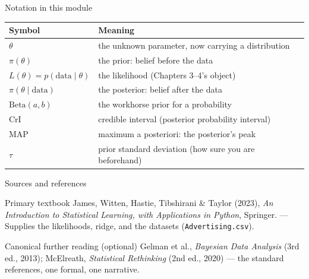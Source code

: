 \documentclass[aspectratio=169,11pt]{beamer}
\begin{document}
\begin{frame}{Notation in this module}
  \footnotesize
  \begin{center}
  \begin{tabular}{@{}ll@{}}
    \toprule
    \textbf{Symbol} & \textbf{Meaning} \\
    \midrule
    $\theta$ & the unknown parameter, now carrying a distribution \\
    $\pi(\theta)$ & the prior: belief before the data \\
    $L(\theta) = p(\text{data} \mid \theta)$ & the likelihood (Chapters 3--4's object) \\
    $\pi(\theta \mid \text{data})$ & the posterior: belief after the data \\
    $\text{Beta}(a, b)$ & the workhorse prior for a probability \\
    CrI & credible interval (posterior probability interval) \\
    MAP & maximum a posteriori: the posterior's peak \\
    $\tau$ & prior standard deviation (how sure you are beforehand) \\
    \bottomrule
  \end{tabular}
  \end{center}
\end{frame}

\begin{frame}{Sources and references}
  \begin{block}{Primary textbook}
    James, Witten, Hastie, Tibshirani \& Taylor (2023),
    \emph{An Introduction to Statistical Learning, with Applications in Python},
    Springer. --- Supplies the likelihoods, ridge, and the datasets
    (\texttt{Advertising.csv}).
  \end{block}
  \begin{block}{Canonical further reading (optional)}
    Gelman et al., \emph{Bayesian Data Analysis} (3rd ed., 2013);
    McElreath, \emph{Statistical Rethinking} (2nd ed., 2020) --- the standard
    references, one formal, one narrative.
  \end{block}
\end{frame}
\end{document}
